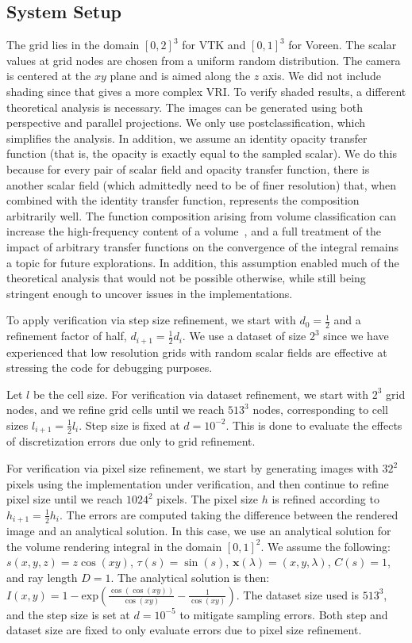 \subsection{System Setup}

The grid lies in the domain $[0, 2]^3$ for VTK and $[0, 1]^3$ for
Voreen. The scalar values at grid nodes are chosen from a uniform
random distribution. The camera is centered at the $xy$ plane and is aimed 
along the $z$ axis. We did not include shading since that gives a
more complex VRI. To verify shaded results, a different
theoretical analysis is necessary.  The images can be generated using
both perspective and parallel projections. We only use
postclassification, which simplifies the analysis. In addition, we
assume an identity opacity transfer function (that is, the opacity is
exactly equal to the sampled scalar). We do this
because for every pair of scalar field and opacity transfer function,
there is another scalar field (which admittedly need to be of
finer resolution) that, when combined with the identity
transfer function, represents the composition arbitrarily well.
%
The function composition arising from volume classification 
can increase the high-frequency content of a
volume~\cite{Bergner:2006:ASA}, and a full treatment of the impact of
arbitrary transfer functions on the convergence of the integral
remains a topic for future explorations. In addition, this assumption
enabled much of the theoretical analysis that would not be 
possible otherwise, while still being stringent enough to uncover
issues in the implementations.

To apply verification via step size refinement, we start with $d_0 =
\frac{1}{2}$ and a refinement factor of half, $d_{i+1} = \frac{1}{2}
d_i$. We use a dataset of size $2^3$ since we have experienced that
low resolution grids with random scalar fields are effective at
stressing the code for debugging purposes.

Let $l$ be the cell size.
For verification via dataset refinement, we start with $2^3$ grid
nodes, and we refine grid cells until we reach $513^3$ nodes,
corresponding to cell sizes $l_{i+1} = \frac{1}{2} l_i$. Step size is
fixed at $d = 10^{-2}$. This is done to evaluate the effects
of discretization errors due only to grid refinement.

For verification via pixel size refinement, we start by generating
images with $32^2$ pixels using the implementation under verification,
and then continue to refine pixel size until we reach $1024^2$
pixels. The pixel size $h$ is refined according to $h_{i+1} =
\frac{1}{2} h_i$. The errors are computed taking the difference
between the rendered image and an analytical solution. In this case,
we use an analytical solution for the volume rendering integral in the
domain $[0,1]^2$. We assume the following: $s(x,y,z) = z \cos(xy)$,
$\tau(s) = \sin(s)$, $\textbf{x}(\lambda) = (x, y, \lambda)$, $C(s)
= 1$, and ray length $D = 1$. The analytical solution is then:
$I(x,y) = 1-\mathrm{exp}{\left(\frac{\cos(\cos(xy))}{\cos(xy)}-\frac{1}{\cos(xy)}\right)}.$
The dataset size used is $513^3$, and the step size is set at $d =
10^{-5}$ to mitigate sampling errors. Both step and dataset size are
fixed to only evaluate errors due to pixel size refinement.

